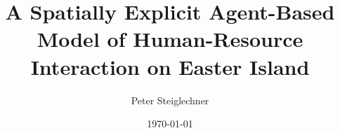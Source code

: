\documentclass{kththesis}
\title{A Spatially Explicit Agent-Based Model of Human-Resource Interaction on Easter Island}
\author{Peter Steiglechner}
\date{\today}
\begin{document}
\frontmatter
%
\titlepage

\begin{abstract}
	
\end{abstract}
\begin{otherlanguage}{swedish}
\end{otherlanguage}

\tableofcontents

\mainmatter
%












\printbibliography[heading=bibintoc]

\appendix


\tailmatter
\end{document}
